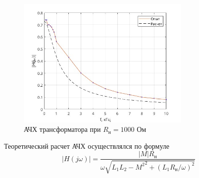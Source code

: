 \documentclass[a4paper,14pt ]{article} %
\begin{document}
    \begin{figure}[H]
        \centering
        \includegraphics[width=0.75\textwidth]{R_1000}
        \caption{АЧХ трансформатора при $R_{\text{н}} = 1000$ Ом}
        \label{fig:2}
    \end{figure}
    \newpage
    Теоретический расчет АЧХ осуществлялся по формуле
    \begin{equation}
        |H(j\omega)| = \frac{|M|R_{\text{н}}}{\omega \sqrt{{L_1 L_2 - M^2}^2 + (L_1R_{\text{н}}/\omega)^2}}
    \end{equation}
\end{document}
